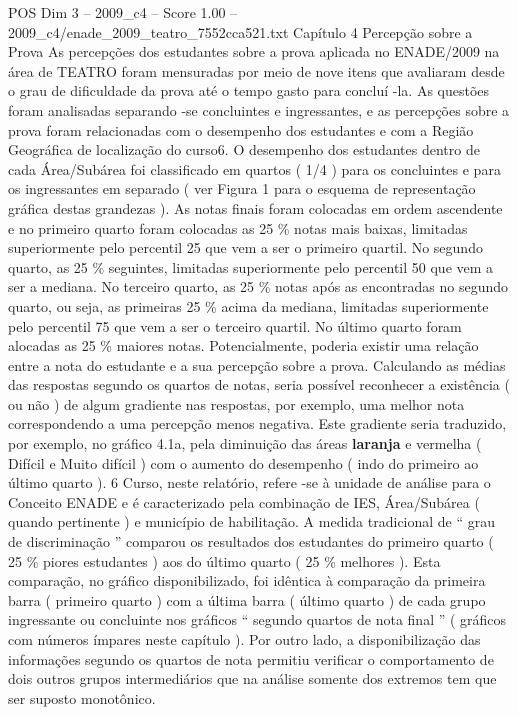 \begin{textsample}{POS Dim 3 – 2009\_c4 – Score 1.00 – 2009\_c4/enade\_2009\_teatro\_7552cca521.txt}  \label{ex:f3_pos_127}
Capítulo 4 Percepção sobre a Prova As percepções dos estudantes sobre a prova aplicada no ENADE/2009 na área de TEATRO foram mensuradas por meio de nove itens que avaliaram desde o grau de dificuldade da prova até o tempo gasto para concluí -la.
As questões foram analisadas separando -se concluintes e ingressantes, e as percepções sobre a prova foram relacionadas com o desempenho dos estudantes e com a Região Geográfica de localização do curso6.
O desempenho dos estudantes dentro de cada Área/Subárea foi classificado em quartos ( 1/4 ) para os concluintes e para os ingressantes em separado ( ver Figura 1 para o esquema de representação gráfica destas grandezas ).
As notas finais foram colocadas em ordem ascendente e no primeiro quarto foram colocadas as 25 \% notas mais baixas, limitadas superiormente pelo percentil 25 que vem a ser o primeiro quartil.
No segundo quarto, as 25 \% seguintes, limitadas superiormente pelo percentil 50 que vem a ser a mediana.
No terceiro quarto, as 25 \% notas após as encontradas no segundo quarto, ou seja, as primeiras 25 \% acima da mediana, limitadas superiormente pelo percentil 75 que vem a ser o terceiro quartil.
No último quarto foram alocadas as 25 \% maiores notas.
Potencialmente, poderia existir uma relação entre a nota do estudante e a sua percepção sobre a prova.
Calculando as médias das respostas segundo os quartos de notas, seria possível reconhecer a existência ( ou não ) de algum gradiente nas respostas, por exemplo, uma melhor nota correspondendo a uma percepção menos negativa.
Este gradiente seria traduzido, por exemplo, no gráfico 4.1a, pela diminuição das áreas \textbf{laranja} e vermelha ( Difícil e Muito difícil ) com o aumento do desempenho ( indo do primeiro ao último quarto ). 6 Curso, neste relatório, refere -se à unidade de análise para o Conceito ENADE e é caracterizado pela combinação de IES, Área/Subárea ( quando pertinente ) e município de habilitação.
A medida tradicional de “ grau de discriminação ” comparou os resultados dos estudantes do primeiro quarto ( 25 \% piores estudantes ) aos do último quarto ( 25 \% melhores ).
Esta comparação, no gráfico disponibilizado, foi idêntica à comparação da primeira barra ( primeiro quarto ) com a última barra ( último quarto ) de cada grupo ingressante ou concluinte nos gráficos “ segundo quartos de nota final ” ( gráficos com números ímpares neste capítulo ).
Por outro lado, a disponibilização das informações segundo os quartos de nota permitiu verificar o comportamento de dois outros grupos intermediários que na análise somente dos extremos tem que ser suposto monotônico.

\end{textsample}
